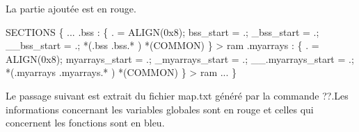 \documentclass[12pt,a4paper]{article}
\begin{document}
La partie ajoutée est en rouge.
\begin{framed}
 {\selectfont
SECTIONS
\{\newline
...\newline
 .bss   :\newline
  \{\newline
    . = ALIGN(0x8);\newline
    bss\_start = .;\newline
    \_bss\_start = .;\newline
    \_\_bss\_start = .;\newline
    *(.bss .bss.* )\newline
    *(COMMON)\newline
  \}  > ram\newline
  \color{red}
  .myarrays  :\newline
\{\newline
  . = ALIGN(0x8);\newline
    myarrays\_start = .;\newline
    \_myarrays\_start = .;\newline
    \_\_.myarrays\_start = .;\newline
    *(.myarrays .myarrays.* )\newline
    *(COMMON)\newline
\}  > ram\newline
  \color{black}
...\newline
\}\newline
}
\end{framed}
Le passage suivant est extrait du fichier map.txt généré par la commande ??.Les informations concernant les variables globales sont en rouge et celles qui concernent les fonctions sont en bleu.
\end{document}
